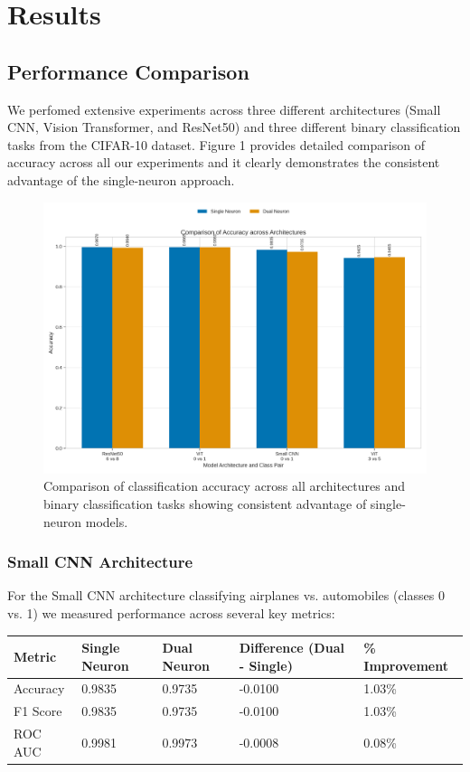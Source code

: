 \documentclass[11pt]{article}
\begin{document}


\section{Results}
\subsection{Performance Comparison}
We perfomed extensive experiments across three different architectures (Small CNN, Vision Transformer, and ResNet50) and three different binary classification tasks from the CIFAR-10 dataset. Figure 1 provides detailed comparison of accuracy across all our experiments and it clearly demonstrates the consistent advantage of the single-neuron approach.

\begin{figure}[htbp]
\centering
\includegraphics[width=\textwidth]{figures/accuracy_comparison.png}
\caption{Comparison of classification accuracy across all architectures and binary classification tasks showing consistent advantage of single-neuron models.}
\end{figure}

\subsubsection{Small CNN Architecture}
For the Small CNN architecture classifying airplanes vs. automobiles (classes 0 vs. 1) we measured performance across several key metrics:

\begin{tabular}{lllll}
\hline
Metric & Single Neuron & Dual Neuron & Difference (Dual - Single) & \% Improvement \\
\hline
Accuracy & 0.9835 & 0.9735 & -0.0100 & 1.03\% \\
F1 Score & 0.9835 & 0.9735 & -0.0100 & 1.03\% \\
ROC AUC & 0.9981 & 0.9973 & -0.0008 & 0.08\% \\
\hline
\end{tabular}
\end{document}
